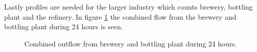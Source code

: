 



Lastly profiles are needed for the larger industry which counts brewery, bottling plant and the refinery. In figure \ref{fig:flow_profile_industry} the combined flow from the brewery and bottling plant during 24 hours is seen.

\begin{figure}[H]
	\centering
	
	\caption{Combined outflow from brewery and bottling plant during 24 hours.}
	\label{fig:flow_profile_industry}
\end{figure}	

